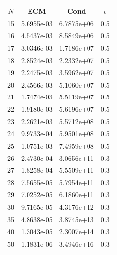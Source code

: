 \documentclass[11pt,a4paper]{article}
\author{Marina Esgueva Ruiz}
\begin{document}
\begin{table}
\centering
\begin{tabular}{|c|ccc|}
\hline
$N$ & ECM & Cond & $\epsilon$ \\
\hline
15 & 5.6955e-03 & 6.7875e+06 & 0.5 \\
16 & 4.5437e-03& 8.5849e+06& 0.5\\
17&3.0346e-03& 1.7186e+07&0.5\\
18&2.8524e-03 & 2.2332e+07& 0.5 \\
19& 2.2475e-03& 3.5962e+07 & 0.5 \\
20&  2.4566e-03&5.1060e+07 &0.5 \\
21 &1.7474e-03& 5.5119e+07&0.5\\
22& 1.9180e-03& 5.6196e+07& 0.5\\
23& 2.2621e-03& 5.5712e+08& 0.5 \\
24& 9.9733e-04&  5.9501e+08& 0.5 \\
25& 1.0751e-03 & 7.4959e+08& 0.5 \\
26& 2.4730e-04&3.0656e+11& 0.3\\
27& 1.8258e-04& 5.5509e+11& 0.3 \\
28& 7.5655e-05& 5.7954e+11& 0.3 \\
29 &  7.0252e-05& 6.1860e+11& 0.3\\
30& 9.7165e-05& 4.3176e+12& 0.3 \\
35&  4.8638e-05& 3.8745e+13& 0.3 \\
40& 1.3043e-05& 2.3007e+14&0.3 \\
50&1.1831e-06& 3.4946e+16& 0.3 \\
\hline


\end{tabular}
\end{table}
\end{document}
